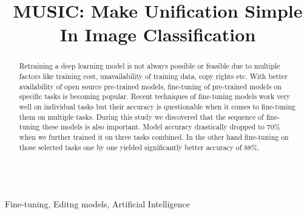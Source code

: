 \documentclass[conference]{IEEEtran}
\begin{document}
\title{MUSIC: Make Unification Simple In Image Classification \\}

\author{
}



\maketitle

\begin{abstract}
Retraining a deep learning model is not always possible or feasible due to multiple factors like training cost, unavailability of training data, copy rights etc. With better availability of open source pre-trained models, fine-tuning of pre-trained models on specific tasks is becoming popular. Recent techniques of fine-tuning models work very well on individual tasks but their accuracy is questionable when it comes to fine-tuning them on multiple tasks. During this study we discovered that the sequence of fine-tuning these models is also important. Model accuracy drastically dropped to 70\% when we further trained it on three tasks combined. In the other hand fine-tuning on those selected tasks one by one yielded significantly better accuracy of 88\%.
\end{abstract}


\begin{IEEEkeywords}
\vspace{0.5cm} \\ Fine-tuning, Editng models, Artificial Intelligence
\end{IEEEkeywords}
\end{document}
